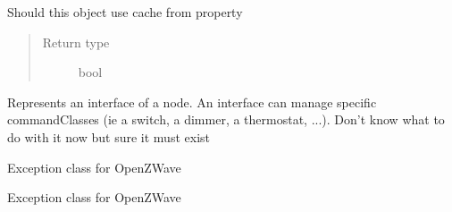 \documentclass[letterpaper,10pt,english]{sphinxmanual}
\begin{document}
\begin{fulllineitems}
\begin{fulllineitems}
\begin{quote}
\begin{description}
\end{description}\end{quote}

\end{fulllineitems}


\begin{fulllineitems}
\label{object:openzwave.object.ZWaveObject.use_cache}
Should this object use cache from property
\begin{quote}\begin{description}
\item[{Return type}] \leavevmode
bool

\end{description}\end{quote}

\end{fulllineitems}


\end{fulllineitems}


\begin{fulllineitems}
\label{object:openzwave.object.ZWaveNodeInterface}
Represents an interface of a node. An interface can manage
specific commandClasses (ie a switch, a dimmer, a thermostat, ...).
Don't know what to do with it now but sure it must exist

\end{fulllineitems}


\begin{fulllineitems}
\label{object:openzwave.object.ZWaveException}
Exception class for OpenZWave

\end{fulllineitems}


\begin{fulllineitems}
\label{object:openzwave.object.ZWaveTypeException}
Exception class for OpenZWave

\end{fulllineitems}
\end{document}
